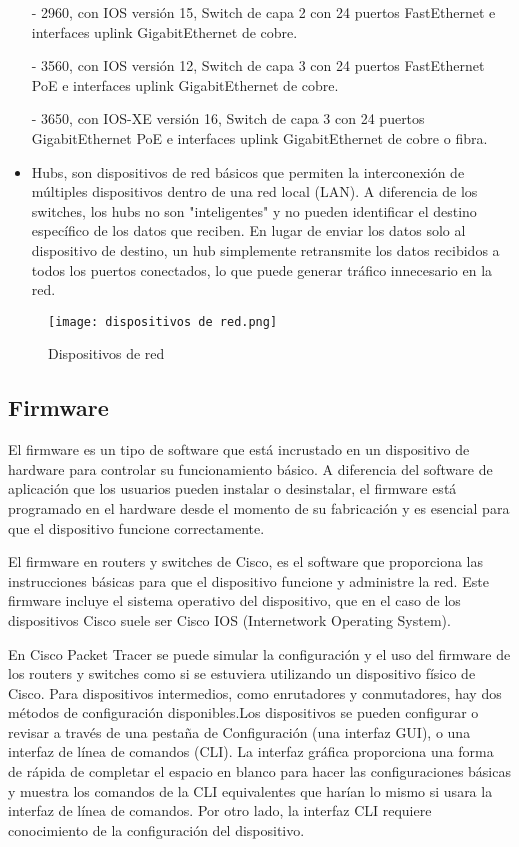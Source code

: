 \documentclass{article}
\begin{document}
\begin{itemize}
    - 2960, con IOS versión 15, Switch de capa 2 con 24 puertos FastEthernet e interfaces uplink GigabitEthernet de cobre.

    - 3560, con IOS versión 12, Switch de capa 3 con 24 puertos FastEthernet PoE e interfaces uplink GigabitEthernet de cobre.

    - 3650, con IOS-XE versión 16, Switch de capa 3 con 24 puertos GigabitEthernet PoE e interfaces uplink GigabitEthernet de cobre o fibra.

    \item Hubs, son dispositivos de red básicos que permiten la interconexión de múltiples dispositivos dentro de una red local (LAN). A diferencia de los switches, los hubs no son "inteligentes" y no pueden identificar el destino específico de los datos que reciben. En lugar de enviar los datos solo al dispositivo de destino, un hub simplemente retransmite los datos recibidos a todos los puertos conectados, lo que puede generar tráfico innecesario en la red.
\end{itemize}
\begin{figure}[h]
  \centering
  \texttt{[image: dispositivos de red.png]}
  \caption{Dispositivos de red}
\end{figure}
\subsection{Firmware}
El firmware es un tipo de software que está incrustado en un dispositivo de hardware para controlar su funcionamiento básico. A diferencia del software de aplicación que los usuarios pueden instalar o desinstalar, el firmware está programado en el hardware desde el momento de su fabricación y es esencial para que el dispositivo funcione correctamente.

El firmware en routers y switches de Cisco, es el software que proporciona las instrucciones básicas para que el dispositivo funcione y administre la red. Este firmware incluye el sistema operativo del dispositivo, que en el caso de los dispositivos Cisco suele ser Cisco IOS (Internetwork Operating System).

En Cisco Packet Tracer se puede simular la configuración y el uso del firmware de los routers y switches como si se estuviera utilizando un dispositivo físico de Cisco. Para dispositivos intermedios, como enrutadores y conmutadores, hay dos métodos de configuración disponibles.Los dispositivos se pueden configurar o revisar a través de una pestaña de Configuración (una interfaz GUI), o una interfaz de línea de comandos (CLI). La interfaz gráfica proporciona una forma de rápida de completar el espacio en blanco para hacer las configuraciones básicas y muestra los comandos de la CLI equivalentes que harían lo mismo si usara la interfaz de línea de comandos. Por otro lado, la interfaz CLI requiere conocimiento de la configuración del dispositivo.
\end{document}
